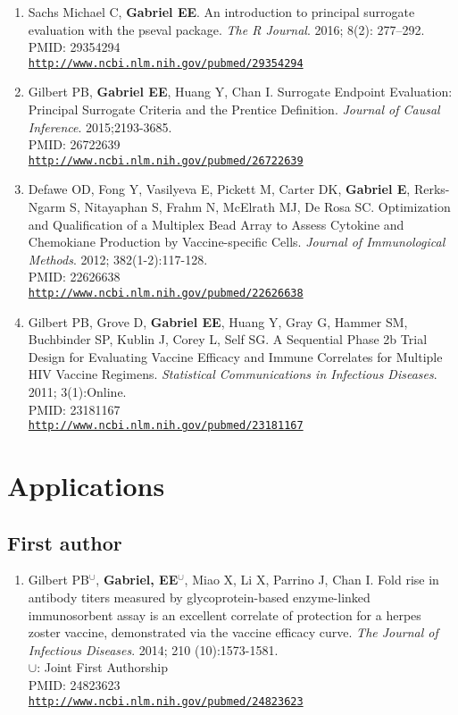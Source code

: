 \documentclass[12pt]{article}
\providecommand \url[1]{\href{#1}{#1}}
\renewcommand*\url[1]{\href{#1}{\texttt{#1}}}
\begin{document}
\begin{enumerate}
\item Sachs  Michael C, \textbf{Gabriel  EE}. An introduction to principal surrogate evaluation with the pseval package. \emph{The R Journal}. 2016; 8(2): 277--292. \\
PMID: 29354294 \\
\url{http://www.ncbi.nlm.nih.gov/pubmed/29354294}

\item Gilbert PB, \textbf{Gabriel EE}, Huang Y,  Chan I. Surrogate Endpoint Evaluation: Principal Surrogate Criteria and the Prentice Definition. \emph{Journal of Causal Inference}.  2015;2193-3685.\\
PMID: 26722639\\
\url{http://www.ncbi.nlm.nih.gov/pubmed/26722639}

\item Defawe OD, Fong Y, Vasilyeva E, Pickett M, Carter DK, \textbf{Gabriel E}, Rerks-Ngarm S, Nitayaphan S, Frahm N, McElrath MJ, De Rosa SC. Optimization and Qualification of a Multiplex Bead Array to Assess Cytokine and Chemokiane Production by Vaccine-specific Cells. \emph{Journal of Immunological Methods}. 2012; 382(1-2):117-128.\\
PMID: 22626638\\
\url{http://www.ncbi.nlm.nih.gov/pubmed/22626638}


\item Gilbert PB, Grove D, \textbf{Gabriel EE}, Huang Y, Gray G, Hammer SM, Buchbinder SP, Kublin J, Corey L, Self SG. A Sequential Phase 2b Trial Design for Evaluating Vaccine Efficacy and Immune Correlates for Multiple HIV Vaccine Regimens. \emph{Statistical Communications in Infectious Diseases}. 2011; 3(1):Online.\\
PMID: 23181167\\
\url{http://www.ncbi.nlm.nih.gov/pubmed/23181167}
\end{enumerate}


\section*{Applications}

\subsection{First author}
\begin{enumerate}
\item Gilbert PB$^\cup$, \textbf{Gabriel, EE}$^\cup$, Miao X, Li X, Parrino J, Chan I. Fold rise in antibody titers measured by glycoprotein-based enzyme-linked immunosorbent assay is an excellent correlate of protection for a herpes zoster vaccine, demonstrated via the vaccine efficacy curve. \emph{The Journal of Infectious Diseases}. 2014; 210 (10):1573-1581. \\
$ \cup$: Joint First Authorship\\
PMID: 24823623\\
\url{http://www.ncbi.nlm.nih.gov/pubmed/24823623}
\end{enumerate}
\end{document}

